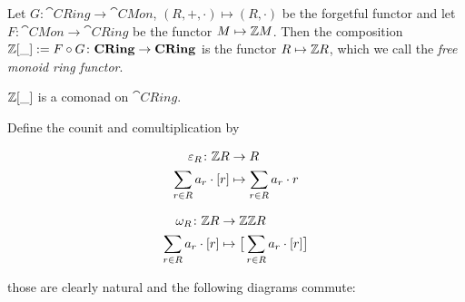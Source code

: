 Let $G \colon \cat{CRing} \to \cat{CMon}$, $(R,+,\cdot) \mapsto (R,\cdot)$
be the forgetful functor and
let $F \colon \cat{CMon} \to \cat{CRing}$ be the functor
$M \mapsto \mathbb{Z} M$. Then the composition $\mathbb{Z}[\_] := F \circ G \colon \mathbf{CRing} \to \mathbf{CRing}$
is the functor $R \mapsto \mathbb{Z} R$, which we call the \textit{free monoid ring functor}.
\begin{claim*}
    $\mathbb{Z}[\_]$ is a comonad on $\cat{CRing}$.
\end{claim*}
\begin{beweis}
    Define the counit and comultiplication by
    \begin{figure}[H]
    \centering
    \begin{subfigure}{0.4\textwidth}
    \centering
    \begin{align*}
    \varepsilon_R \colon \mathbb{Z} R &\to R \\
    \sum_{r \in R} a_r \cdot [r] &\mapsto  \sum_{r \in R} a_r \cdot r
    \end{align*}
    \end{subfigure}
    \hspace{2em}
    \begin{subfigure}{0.4\textwidth}
    \centering
    \begin{align*}
    \omega_R \colon \mathbb{Z} R &\to \mathbb{Z} \mathbb{Z} R \\
    \sum_{r \in R} a_r \cdot [r] &\mapsto \big[\sum_{r \in R} a_r \cdot [r]\big]
    \end{align*}
    \end{subfigure}
    \end{figure}
    those are clearly natural and the following diagrams commute:
    \begin{figure}[H]
        \centering
        \begin{subfigure}{0.4\textwidth}
        \centering
        \end{subfigure}
        \hspace{2em}
        \begin{subfigure}{0.4\textwidth}
        \centering
        \end{subfigure}
        \end{figure}
\end{beweis}
